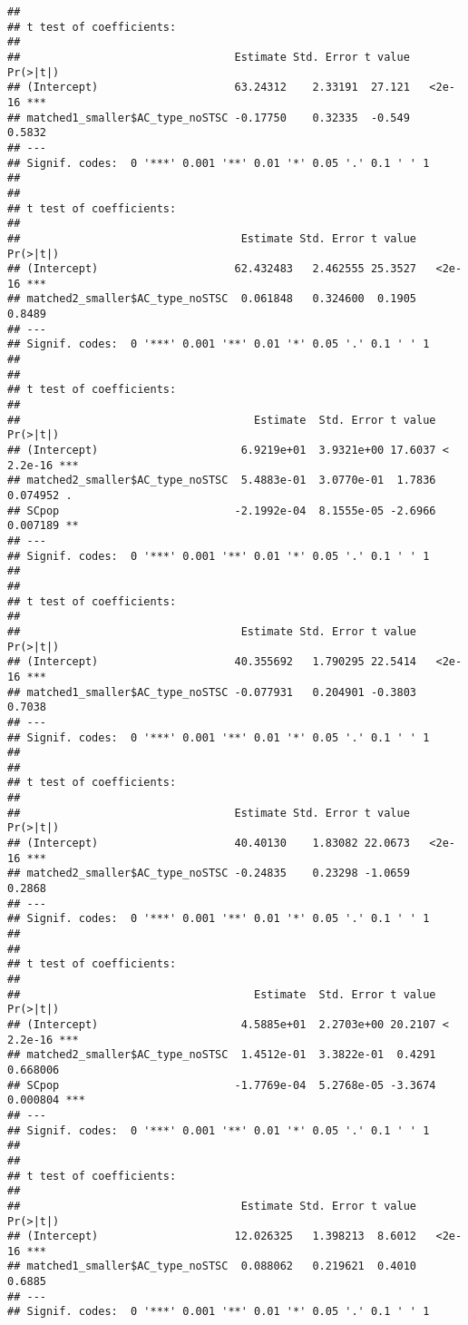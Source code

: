 \documentclass[
]{article}
\begin{document}
\begin{verbatim}
## 
## t test of coefficients:
## 
##                                 Estimate Std. Error t value Pr(>|t|)    
## (Intercept)                     63.24312    2.33191  27.121   <2e-16 ***
## matched1_smaller$AC_type_noSTSC -0.17750    0.32335  -0.549   0.5832    
## ---
## Signif. codes:  0 '***' 0.001 '**' 0.01 '*' 0.05 '.' 0.1 ' ' 1
## 
## 
## t test of coefficients:
## 
##                                  Estimate Std. Error t value Pr(>|t|)    
## (Intercept)                     62.432483   2.462555 25.3527   <2e-16 ***
## matched2_smaller$AC_type_noSTSC  0.061848   0.324600  0.1905   0.8489    
## ---
## Signif. codes:  0 '***' 0.001 '**' 0.01 '*' 0.05 '.' 0.1 ' ' 1
## 
## 
## t test of coefficients:
## 
##                                    Estimate  Std. Error t value  Pr(>|t|)    
## (Intercept)                      6.9219e+01  3.9321e+00 17.6037 < 2.2e-16 ***
## matched2_smaller$AC_type_noSTSC  5.4883e-01  3.0770e-01  1.7836  0.074952 .  
## SCpop                           -2.1992e-04  8.1555e-05 -2.6966  0.007189 ** 
## ---
## Signif. codes:  0 '***' 0.001 '**' 0.01 '*' 0.05 '.' 0.1 ' ' 1
## 
## 
## t test of coefficients:
## 
##                                  Estimate Std. Error t value Pr(>|t|)    
## (Intercept)                     40.355692   1.790295 22.5414   <2e-16 ***
## matched1_smaller$AC_type_noSTSC -0.077931   0.204901 -0.3803   0.7038    
## ---
## Signif. codes:  0 '***' 0.001 '**' 0.01 '*' 0.05 '.' 0.1 ' ' 1
## 
## 
## t test of coefficients:
## 
##                                 Estimate Std. Error t value Pr(>|t|)    
## (Intercept)                     40.40130    1.83082 22.0673   <2e-16 ***
## matched2_smaller$AC_type_noSTSC -0.24835    0.23298 -1.0659   0.2868    
## ---
## Signif. codes:  0 '***' 0.001 '**' 0.01 '*' 0.05 '.' 0.1 ' ' 1
## 
## 
## t test of coefficients:
## 
##                                    Estimate  Std. Error t value  Pr(>|t|)    
## (Intercept)                      4.5885e+01  2.2703e+00 20.2107 < 2.2e-16 ***
## matched2_smaller$AC_type_noSTSC  1.4512e-01  3.3822e-01  0.4291  0.668006    
## SCpop                           -1.7769e-04  5.2768e-05 -3.3674  0.000804 ***
## ---
## Signif. codes:  0 '***' 0.001 '**' 0.01 '*' 0.05 '.' 0.1 ' ' 1
## 
## 
## t test of coefficients:
## 
##                                  Estimate Std. Error t value Pr(>|t|)    
## (Intercept)                     12.026325   1.398213  8.6012   <2e-16 ***
## matched1_smaller$AC_type_noSTSC  0.088062   0.219621  0.4010   0.6885    
## ---
## Signif. codes:  0 '***' 0.001 '**' 0.01 '*' 0.05 '.' 0.1 ' ' 1

\end{verbatim}
\end{document}
